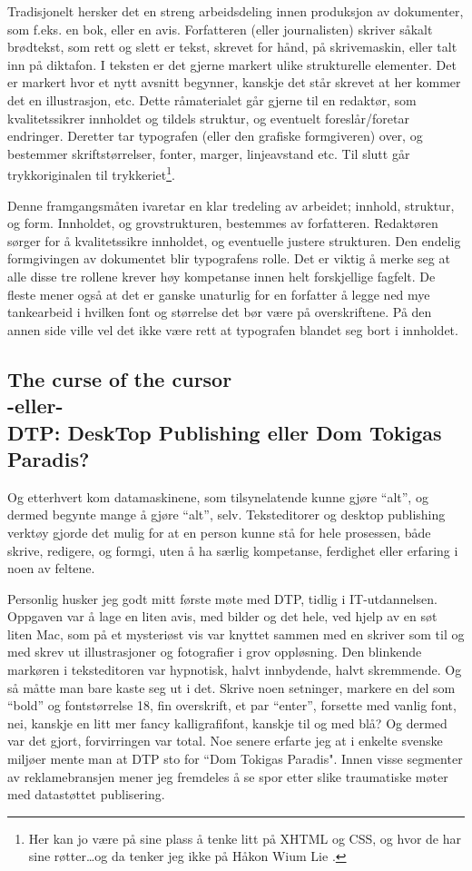 Tradisjonelt hersker det en streng arbeidsdeling innen produksjon av dokumenter, som f.eks. en bok, eller en avis. Forfatteren (eller journalisten) skriver såkalt {\rm brødtekst}, som rett og slett er tekst, skrevet for hånd, på skrivemaskin, eller talt inn på diktafon. I teksten er det gjerne markert ulike strukturelle elementer. Det er markert hvor et nytt avsnitt begynner, kanskje det står skrevet at her kommer det en illustrasjon, etc. Dette råmaterialet går gjerne til en redaktør, som kvalitetssikrer innholdet og tildels struktur, og eventuelt foreslår/foretar endringer. Deretter tar typografen (eller den grafiske formgiveren) over, og bestemmer skriftstørrelser, fonter, marger, linjeavstand etc. Til slutt går trykkoriginalen til trykkeriet\footnote{Her kan jo være på sine plass å tenke litt på XHTML og CSS, og hvor de har sine røtter\dots og da tenker jeg ikke på Håkon Wium Lie \smiley.}.

Denne framgangsmåten ivaretar en klar tredeling av arbeidet; innhold, struktur, og form. Innholdet, og grovstrukturen, bestemmes av forfatteren. Redaktøren sørger for å kvalitetssikre innholdet, og eventuelle justere strukturen. Den endelig formgivingen av dokumentet blir typografens rolle. Det er viktig å merke seg at alle disse tre rollene krever høy kompetanse innen helt forskjellige fagfelt. De fleste mener også at det er ganske unaturlig for en forfatter å legge ned mye tankearbeid i hvilken font og størrelse det bør være på overskriftene. På den annen side ville vel det ikke være rett at typografen blandet seg bort i innholdet.

\subsection{The curse of the cursor \\  \normalsize -eller- \\DTP: DeskTop Publishing eller Dom Tokigas Paradis? }

Og etterhvert kom datamaskinene, som tilsynelatende kunne gjøre ``alt'', og dermed begynte mange å gjøre ``alt'', selv. Teksteditorer og desktop publishing verktøy gjorde det mulig for at en person kunne stå for hele prosessen, både skrive, redigere, og formgi, uten å ha særlig kompetanse, ferdighet eller erfaring i noen av feltene.

Personlig husker jeg godt mitt første møte med DTP, tidlig i IT-utdannelsen. Oppgaven var å lage en liten avis, med bilder og det hele, ved hjelp av en søt liten Mac, som på et mysteriøst vis var knyttet sammen med en skriver som til og med skrev ut illustrasjoner og fotografier i grov oppløsning. Den blinkende markøren i teksteditoren var hypnotisk, halvt innbydende, halvt skremmende. Og så måtte man bare kaste seg ut i det. Skrive noen setninger, markere en del som ``bold'' og fontstørrelse 18, fin overskrift, et par ``enter'', forsette med vanlig font, nei, kanskje en litt mer fancy kalligrafifont, kanskje til og med blå? Og dermed var det gjort, forvirringen var total. Noe senere erfarte jeg at i enkelte svenske miljøer mente man at DTP sto for ``Dom Tokigas Paradis". Innen visse segmenter av reklamebransjen mener jeg fremdeles å se spor etter slike traumatiske møter med datastøttet publisering.

